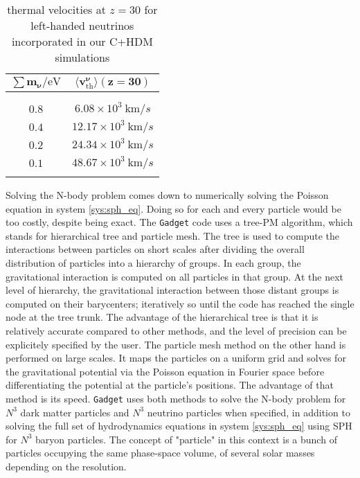 \begin{table}
	\begin{center}
	\begin{small}
		\begin{tabular}{cc}
			$\pmb{\sum m_\nu / \mathrm{eV}}$ & $\pmb{\langle v_{\mathrm{th}}^\nu \rangle (z=30)}$\\[2pt]
			\hline \\[-10pt]
			\\[-10pt]
			$0.8$ & $6.08 \times 10^3~\mathrm{km}/s$ \\[2pt]
			$0.4$ & $12.17 \times 10^3~\mathrm{km}/s$ \\[2pt]
			$0.2$ & $24.34 \times 10^3~\mathrm{km}/s$ \\[2pt]
			$0.1$ & $48.67 \times 10^3~\mathrm{km}/s$ \\[2pt]
			\hline \\[-10pt]
		\end{tabular}
	\end{small}
	\end{center}
	\caption{thermal velocities at $z=30$ for left-handed neutrinos incorporated in our C+HDM simulations}
	\label{tab:vth_chdm}
\end{table}


Solving the N-body problem comes down to numerically solving the Poisson equation in system \ref{sys:sph_eq}. Doing so for each and every particle would be too costly, despite being exact. The \texttt{Gadget} code uses a tree-PM algorithm, which stands for hierarchical tree and particle mesh. The tree is used to compute the interactions between particles on short scales after dividing the overall distribution of particles into a hierarchy of groups. In each group, the gravitational interaction is computed on all particles in that group. At the next level of hierarchy, the gravitational interaction between those distant groups is computed on their barycenters; iteratively so until the code has reached the single node at the tree trunk. The advantage of the hierarchical tree is that it is relatively accurate compared to other methods, and the level of precision can be explicitely specified by the user. The particle mesh method on the other hand is performed on large scales. It maps the particles on a uniform grid and solves for the gravitational potential via the Poisson equation in Fourier space before differentiating the potential at the particle's positions. The advantage of that method is its speed. \texttt{Gadget} uses both methods to solve the N-body problem for $N^3$ dark matter particles and $N^3$ neutrino particles when specified, in addition to solving the full set of hydrodynamics equations in system \ref{sys:sph_eq} using SPH for $N^3$ baryon particles. The concept of "particle" in this context is a bunch of particles occupying the same phase-space volume, of several solar masses depending on the resolution.

